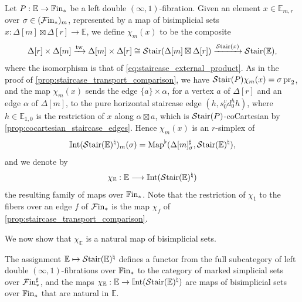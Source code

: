 \documentclass[10pt,reqno]{amsart}
\begin{document}
\begin{construction}
\label{const:chi_roundtrip}
Let $P:\mathbb E\to\mathbb{F}\mathrm{in}_*$ be a left double
$(\infty,1)$-fibration. Given an element $x\in\mathbb E_{m,r}$ over
$\sigma\in(\mathcal{F}\mathrm{in}_*)_m$, represented by a map of bisimplicial sets
$x:\Delta[m]\boxtimes\Delta[r]\to\mathbb E$, we define $\chi_m(x)$
to be the composite
\begin{equation}
\label{eq:compat_chi_formula}
 \Delta[r]\times\Delta[m]
 \xrightarrow{\mathrm{tw}}\Delta[m]\times\Delta[r]
 \cong\mathcal{S}\mathrm{tair}(\Delta[m]\boxtimes\Delta[r])
 \xrightarrow{\mathcal{S}\mathrm{tair}(x)}\mathcal{S}\mathrm{tair}(\mathbb E),
\end{equation}
where the isomorphism is that of
\eqref{eq:staircase_external_product}. As in the proof of
\cref{prop:staircase_transport_comparison}, we have
$\mathcal{S}\mathrm{tair}(P)\chi_m(x)=\sigma\operatorname{pr}_2$, and the map
$\chi_m(x)$ sends the edge $\{a\}\times\alpha$, for a vertex $a$
of $\Delta[r]$ and an edge $\alpha$ of $\Delta[m]$, to the pure
horizontal staircase edge $(h,s_0^v d_0^h h)$, where
$h\in\mathbb E_{1,0}$ is the restriction of $x$ along
$\alpha\boxtimes a$, which is $\mathcal{S}\mathrm{tair}(P)$-coCartesian by
\cref{prop:cocartesian_staircase_edges}. Hence $\chi_m(x)$ is an
$r$-simplex of
\[
 \mathbb{I}\mathrm{nt}(\mathcal{S}\mathrm{tair}(\mathbb E)^\natural)_m(\sigma)
 =\operatorname{Map}^\flat
   (\Delta[m]^\sharp_\sigma,\mathcal{S}\mathrm{tair}(\mathbb E)^\natural),
\]
and we denote by
\[
\chi_{\mathbb E}:\mathbb E\longrightarrow
\mathbb{I}\mathrm{nt}(\mathcal{S}\mathrm{tair}(\mathbb E)^\natural)
\]
the resulting family of maps over $\mathbb{F}\mathrm{in}_*$. Note that the
restriction of $\chi_1$ to the fibers over an edge $f$ of
$\mathcal{F}\mathrm{in}_*$ is the map $\chi_f$ of
\cref{prop:staircase_transport_comparison}.
\end{construction}

We now show that $\chi_{\mathbb E}$ is a natural map of bisimplicial
sets.

\begin{proposition}
\label{prop:chi_is_simplicial}
The assignment $\mathbb E\mapsto\mathcal{S}\mathrm{tair}(\mathbb E)^\natural$ defines a
functor from the full subcategory of left double
$(\infty,1)$-fibrations over $\mathbb{F}\mathrm{in}_*$ to the category of marked
simplicial sets over $\mathcal{F}\mathrm{in}_*^\sharp$, and the maps
$\chi_{\mathbb E}:\mathbb E\to\mathbb{I}\mathrm{nt}(\mathcal{S}\mathrm{tair}(\mathbb E)^\natural)$ are
maps of bisimplicial sets over $\mathbb{F}\mathrm{in}_*$ that are natural in
$\mathbb E$.
\end{proposition}
\end{document}
